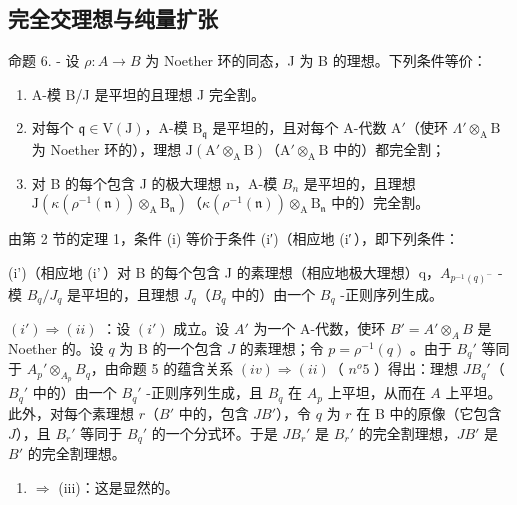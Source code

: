 \subsection{完全交理想与纯量扩张}

命题 6. - 设 \(\rho: A \to B\) 为 Noether 环的同态，J 为 B 的理想。下列条件等价：

\begin{enumerate}
\def\labelenumi{(\roman{enumi})}
\item
  A-模 B/J 是平坦的且理想 J 完全割。
\item
  对每个 \(\mathfrak{q} \in \mathrm{V}(\mathrm{J})\)，A-模 \(\mathrm{B}_{\mathfrak{q}}\) 是平坦的，且对每个 A-代数 \(\mathrm{A}'\)（使环 \(\Lambda' \otimes_{\mathrm{A}} \mathrm{B}\) 为 Noether 环的），理想 \(\mathrm{J}(\mathrm{A}' \otimes_{\mathrm{A}} \mathrm{B})\)（\(\mathrm{A}' \otimes_{\mathrm{A}} \mathrm{B}\) 中的）都完全割；
\item
  对 B 的每个包含 J 的极大理想 n，A-模 \(B_{n}\) 是平坦的，且理想 \(\mathrm{J}(\kappa(\rho^{-1}(\mathfrak{n}))\otimes_{\mathrm{A}}\mathrm{B}_{\mathfrak{n}})\)（\(\kappa(\rho^{-1}(\mathfrak{n}))\otimes_{\mathrm{A}}\mathrm{B}_{\mathfrak{n}}\) 中的）完全割。
\end{enumerate}

由第 2 节的定理 1，条件 (i) 等价于条件 (i′)（相应地 (i′\,），即下列条件：

(i')（相应地 (i'\,）对 B 的每个包含 J 的素理想（相应地极大理想）q，\(A_{p^{-1}(q)^{-}}\) -模 \(B_{q}/J_{q}\) 是平坦的，且理想 \(J_{q}\)（\(B_{q}\) 中的）由一个 \(B_{q}\) -正则序列生成。

\((i') \Rightarrow (ii)\) ：设 \((i')\) 成立。设 \(A'\) 为一个 A-代数，使环 \(B' = A' \otimes_A B\) 是 Noether 的。设 \(q\) 为 B 的一个包含 \(J\) 的素理想；令 \(p = \rho^{-1}(q)\) 。由于 \(B_q'\) 等同于 \(A_p' \otimes_{A_p} B_q\)，由命题 5 的蕴含关系 \((iv) \Rightarrow (ii)\)（ \(n^o 5\) ）得出：理想 \(JB_q'\)（\(B_q'\) 中的）由一个 \(B_q'\) -正则序列生成，且 \(B_q\) 在 \(A_p\) 上平坦，从而在 \(A\) 上平坦。此外，对每个素理想 \(r\)（\(B'\) 中的，包含 \(JB'\)），令 \(q\) 为 \(r\) 在 B 中的原像（它包含 \(J\)），且 \(B_r'\) 等同于 \(B_q'\) 的一个分式环。于是 \(JB_r'\) 是 \(B_r'\) 的完全割理想，\(JB'\) 是 \(B'\) 的完全割理想。

\begin{enumerate}
\def\labelenumi{(\roman{enumi})}
\setcounter{enumi}{1}
\tightlist
\item
  \(\Rightarrow\) (iii)：这是显然的。
\end{enumerate}

